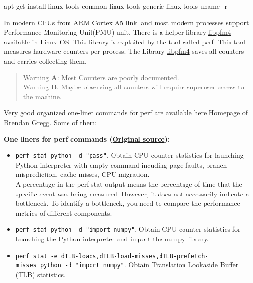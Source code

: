 \documentclass[
]{article}
\newenvironment{Shaded}{}{}
\newcommand{\AttributeTok}[1]{\textcolor[rgb]{0.49,0.56,0.16}{#1}}
\newcommand{\ExtensionTok}[1]{#1}
\newcommand{\FunctionTok}[1]{\textcolor[rgb]{0.02,0.16,0.49}{#1}}
\newcommand{\KeywordTok}[1]{\textcolor[rgb]{0.00,0.44,0.13}{\textbf{#1}}}
\newcommand{\NormalTok}[1]{#1}
\begin{document}
\begin{Shaded}
\begin{Highlighting}[]
\ExtensionTok{apt{-}get}\NormalTok{ install linux{-}tools{-}common linux{-}tools{-}generic linux{-}tools{-}}\KeywordTok{\textasciigrave{}}\FunctionTok{uname} \AttributeTok{{-}r}\KeywordTok{\textasciigrave{}}
\end{Highlighting}
\end{Shaded}

In modern CPUs from ARM Cortex A5
\href{https://developer.arm.com/documentation/ddi0434/c/performance-monitoring-unit/about-the-performance-monitoring-unit?lang=en}{link},
and most modern processes support Performance Monitoring Unit(PMU) unit.
There is a helper library
\href{https://man7.org/linux/man-pages/man3/libpfm.3.html}{libpfm4}
available in Linux OS. This library is exploited by the tool called
\href{https://perf.wiki.kernel.org/index.php/Main_Page}{perf}. This tool
measures hardware counters per process. The Library
\href{https://man7.org/linux/man-pages/man3/libpfm.3.html}{libpfm4}
saves all counters and carries collecting them.

\begin{quote}
Warning \textbf{A}: Most Counters are poorly documented.\\
Warning \textbf{B}: Maybe observing all counters will require superuser
access to the machine.
\end{quote}

Very good organized one-liner commands for perf are available here
\href{https://www.brendangregg.com/perf.html}{Homepage of Brendan
Gregg}. Some of them:

\textbf{One liners for perf commands
(\href{https://www.brendangregg.com/perf.html\#OneLiners}{Original
source}):}

\begin{itemize}
\item
  \texttt{perf\ stat\ python\ -d\ "pass"}. Obtain CPU counter statistics
  for launching Python interpreter with empty command incuding page
  faults, branch misprediction, cache misses, CPU migration.\\
  A percentage in the perf stat output means the percentage of time that
  the specific event was being measured. However, it does not
  necessarily indicate a bottleneck. To identify a bottleneck, you need
  to compare the performance metrics of different components.
\item
  \texttt{perf\ stat\ python\ -d\ "import\ numpy"}. Obtain CPU counter
  statistics for launching the Python interpreter and import the numpy
  library.
\item
  \texttt{perf\ stat\ -e\ dTLB-loads,dTLB-load-misses,dTLB-prefetch-misses\ python\ -d\ "import\ numpy"}.
  Obtain Translation Lookaside Buffer (TLB) statistics.
\end{itemize}
\end{document}
